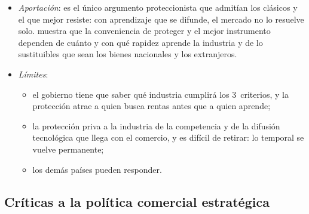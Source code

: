 \documentclass[11pt]{article}
\begin{document}
\begin{itemize}
\item \emph{Aportación}: es el único argumento proteccionista que admitían los clásicos y el que mejor resiste: con aprendizaje que se difunde, el mercado no lo resuelve solo. \textcite{Melitz2005When} muestra que la conveniencia de proteger y el mejor instrumento dependen de cuánto y con qué rapidez aprende la industria y de lo sustituibles que sean los bienes nacionales y los extranjeros.
\item \emph{Límites}:
  \begin{itemize}
  \item el gobierno tiene que saber qué industria cumplirá los 3~criterios, y la protección atrae a quien busca rentas antes que a quien aprende;
  \item la protección priva a la industria de la competencia y de la difusión tecnológica que llega con el comercio, y es difícil de retirar: lo temporal se vuelve permanente;
  \item los demás países pueden responder.
  \end{itemize}
\end{itemize}

\subsection{Críticas a la política comercial estratégica}\label{sec:criticas}
\end{document}
